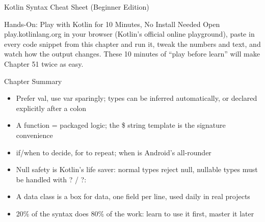 \begin{center}\small\color{gray}Kotlin Syntax Cheat Sheet (Beginner Edition)\end{center}

\begin{tcbpractice}{Hands-On: Play with Kotlin for 10 Minutes, No Install Needed}
Open play.kotlinlang.org in your browser (Kotlin's official online playground), paste in every code snippet from this chapter and run it, tweak the numbers and text, and watch how the output changes. These 10 minutes of “play before learn” will make Chapter 51 twice as easy.

\end{tcbpractice}

\begin{tcbsummary}{Chapter Summary}
\begin{itemize}
  \item Prefer val, use var sparingly; types can be inferred automatically, or declared explicitly after a colon
  \item A function = packaged logic; the \$ string template is the signature convenience
  \item if/when to decide, for to repeat; when is Android's all-rounder
  \item Null safety is Kotlin's life saver: normal types reject null, nullable types must be handled with ? / ?:
  \item A data class is a box for data, one field per line, used daily in real projects
  \item 20\% of the syntax does 80\% of the work: learn to use it first, master it later
\end{itemize}

\end{tcbsummary}
